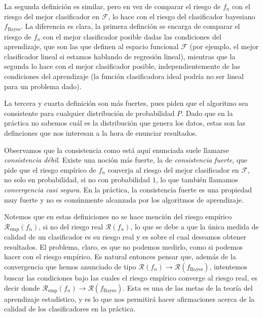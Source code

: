 \documentclass{report}
\begin{document}
La segunda definición es similar, pero en vez de comparar el riesgo de $f_n$ con el riesgo del mejor clasificador en $\mathcal{F}$,
lo hace con el riesgo del clasificador bayesiano $f_{\text{Bayes}}$. La diferencia es clara, la primera definción se encarga de 
comparar el riesgo de $f_n$ con el mejor clasificador posible dadas las condiciones del aprendizaje, que son las que definen al espacio funcional 
$\mathcal{F}$ (por ejemplo, el mejor clasificador lineal si estamos hablando de regresión lineal), mientras que la segunda lo hace con el
mejor clasificador posible, independientemente de las condiciones del aprendizaje (la función clasificadora ideal podría no ser lineal
para un problema dado).\newline

La tercera y cuarta definición son más fuertes, pues piden que el algoritmo sea consistente para cualquier distribución de probabilidad $P$.
Dado que en la práctica no sabemos cuál es la distribución que genera los datos, estas son las definciones que nos interesan a la hora de 
enunciar resultados.\newline

Observamos que la consistencia como está aquí enunciada suele llamarse \textit{consistencia débil}. Existe una noción más fuerte, la de
\textit{consistencia fuerte}, que pide que el riesgo empírico de $f_n$ converja al riesgo del mejor clasificador en $\mathcal{F}$, no solo
en probabilidad, si no con probabilidad $1$, lo que también llamamos \textit{convergencia casi segura}. En la práctica, la consistencia fuerte es una propiedad muy fuerte y no es comúnmente
alcanzada por los algoritmos de aprendizaje.\newline

Notemos que en estas definiciones no se hace mención del riesgo empírico $\mathcal{R}_{\text{emp}}(f_n)$, si no del riesgo real $\mathcal{R}(f_n)$, lo que
se debe a que la única medida de calidad de un clasificador es su riesgo real y es sobre el cual deseamos obtener resultados. El problema, claro,
es que no podemos medirlo, como si podemos hacer con el riesgo empírico. Es natural entonces pensar que, además de la convergencia que hemos anunciado
de tipo $\mathcal{R}(f_n) \rightarrow \mathcal{R}(f_{\text{Bayes}})$, intentemos buscar las condiciones bajo las cuales el riesgo empírico
converge al riesgo real, es decir donde  $\mathcal{R}_{\text{emp}}(f_n) \rightarrow \mathcal{R}(f_{\text{Bayes}})$. Esta es una de las metas
de la teoría del aprendizaje estadístico, y es lo que nos permitirá hacer afirmaciones acerca de la calidad de los clasificadores en la práctica.\newline
\end{document}
